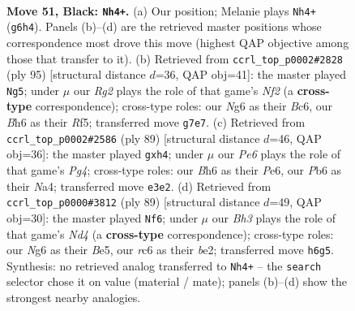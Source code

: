 \documentclass[11pt]{article}
\begin{document}
\clearpage

\begin{figure}[p]\centering
\begin{subfigure}{0.46\textwidth}\centering
\resizebox{\linewidth}{!}{%
\newchessgame
\chessboard[
  setfen={k7/p5r1/PpRB2nb/1B3p2/5P2/4pK2/8/8 b - - 7 51},
  showmover=false,
  pgfstyle=straightmove, color=movearrow, markmove={g6-h4}
]}
\caption{}
\end{subfigure}\hfill
\begin{subfigure}{0.46\textwidth}\centering
\resizebox{\linewidth}{!}{%
\newchessgame
\chessboard[
  setfen={2k5/5n2/p1b1p3/1p3r2/P1p5/2B2P2/4B1P1/3R2K1 b - - 5 48},
  showmover=false,
  pgfstyle=straightmove, color=movearrow, markmove={f7-g5}
]}
\caption{}
\end{subfigure}
\\[4pt]
\begin{subfigure}{0.46\textwidth}\centering
\resizebox{\linewidth}{!}{%
\newchessgame
\chessboard[
  setfen={6k1/5p2/4p2p/4P1p1/n1RB2KP/r5P1/8/8 b - - 0 45},
  showmover=false,
  pgfstyle=straightmove, color=movearrow, markmove={g5-h4}
]}
\caption{}
\end{subfigure}\hfill
\begin{subfigure}{0.46\textwidth}\centering
\resizebox{\linewidth}{!}{%
\newchessgame
\chessboard[
  setfen={3k4/4p2p/3rp3/1p1nb3/8/1KP4P/3BB1P1/5R2 b - - 2 45},
  showmover=false,
  pgfstyle=straightmove, color=movearrow, markmove={d5-f6}
]}
\caption{}
\end{subfigure}
\caption{\textbf{Move 51, Black: \texttt{Nh4+}.} (a) Our position; Melanie plays \texttt{Nh4+} (\texttt{g6h4}). Panels (b)--(d) are the retrieved master positions whose correspondence most drove this move (highest QAP objective among those that transfer to it). (b) Retrieved from \texttt{ccrl\_top\_p0002\#2828} (ply 95) [structural distance $d$=36, QAP obj=41]: the master played \texttt{Ng5}; under $\mu$ our \emph{Rg2} plays the role of that game's \emph{Nf2} (a \textbf{cross-type} correspondence); cross-type roles: our \emph{N}g6 as their \emph{B}c6, our \emph{B}h6 as their \emph{R}f5; transferred move \texttt{g7e7}. (c) Retrieved from \texttt{ccrl\_top\_p0002\#2586} (ply 89) [structural distance $d$=46, QAP obj=36]: the master played \texttt{gxh4}; under $\mu$ our \emph{Pe6} plays the role of that game's \emph{Pg4}; cross-type roles: our \emph{B}h6 as their \emph{P}e6, our \emph{P}b6 as their \emph{N}a4; transferred move \texttt{e3e2}. (d) Retrieved from \texttt{ccrl\_top\_p0000\#3812} (ply 89) [structural distance $d$=49, QAP obj=30]: the master played \texttt{Nf6}; under $\mu$ our \emph{Bh3} plays the role of that game's \emph{Nd4} (a \textbf{cross-type} correspondence); cross-type roles: our \emph{N}g6 as their \emph{B}e5, our \emph{r}c6 as their \emph{b}e2; transferred move \texttt{h6g5}. Synthesis: no retrieved analog transferred to \texttt{Nh4+} -- the \texttt{search} selector chose it on value (material / mate); panels (b)--(d) show the strongest nearby analogies.}
\label{fig:thought-m101}
\end{figure}
\end{document}
